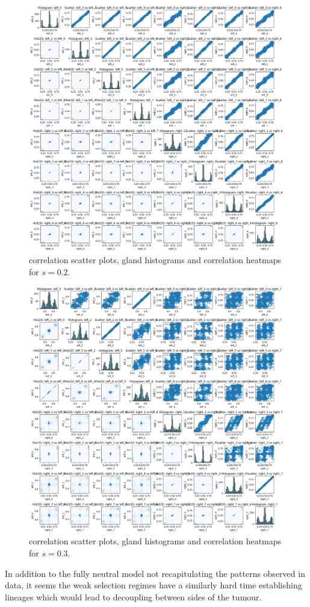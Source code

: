 \begin{figure}[h]
    \centering
    \includegraphics[width=\textwidth]{Chapter_methylation/figures/sensitivity_selective_advantage2.png}
    \caption{correlation scatter plots, gland histograms and correlation heatmaps for $s=0.2$.}
    \label{fig:sensitivity_selective_advantage2}
\end{figure}
\begin{figure}[h]
    \centering
    \includegraphics[width=\textwidth]{Chapter_methylation/figures/sensitivity_selective_advantage3.png}
    \caption{correlation scatter plots, gland histograms and correlation heatmaps for $s=0.3$.}
    \label{fig:sensitivity_selective_advantage3}
\end{figure}
In addition to the fully neutral model not recapitulating the patterns observed in data, it seems the weak selection regimes have a similarly hard time establishing lineages which would lead to decoupling between sides of the tumour.
\clearpage
